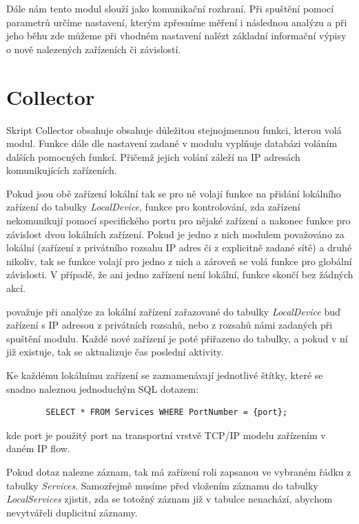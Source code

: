 \documentclass[thesis=B,czech,hidelinks]{FITthesis}[2019/03/21]
\begin{document}
    Dále nám tento modul slouží jako komunikační rozhraní. Při spuštění pomocí parametrů určíme nastavení, kterým zpřesníme měření i následnou analýzu a při jeho běhu zde můžeme při vhodném nastavení nalézt základní informační výpisy o nově nalezených zařízeních či závislostí.
    
    \section{Collector}
    Skript Collector obsahuje obsahuje důležitou stejnojmennou funkci, kterou volá  modul. Funkce dále dle nastavení zadané v modulu vyplňuje databázi  voláním dalších pomocných funkcí. Přičemž jejich volání záleží na IP adresách komunikujících zařízeních. 
    
    Pokud jsou obě zařízení lokální tak se pro ně volají funkce na přidání lokálního zařízení do tabulky \emph{LocalDevice}, funkce pro kontrolování, zda zařízení nekomunikují pomocí specifického portu pro nějaké zařízení a nakonec funkce pro závislost dvou lokálních zařízení. Pokud je jedno z nich modulem považováno za lokální (zařízení z privátního rozsahu IP adres či z explicitně zadané sítě) a druhé nikoliv, tak se funkce volají pro jedno z nich a zároveň se volá funkce pro globální závislosti. V případě, že ani jedno zařízení není lokální, funkce skončí bez žádných akcí.

     považuje při analýze za lokální zařízení zařazované do tabulky \emph{LocalDevice} buď zařízení s IP adresou z privátních rozsahů, nebo z rozsahů námi zadaných při spuštění modulu. Každé nové zařízení je poté přiřazeno do tabulky, a pokud v ní již existuje, tak se aktualizuje čas poslední aktivity.
    
    Ke každému lokálnímu zařízení se zaznamenávají jednotlivé štítky, které se snadno naleznou jednoduchým SQL dotazem:
    
    \begin{verbatim}
        SELECT * FROM Services WHERE PortNumber = {port};\end{verbatim}
     kde port je použitý port na transportní vrstvě TCP/IP modelu zařízením v daném IP flow.
    
    Pokud dotaz nalezne záznam, tak má zařízení roli zapsanou ve vybraném řádku z tabulky \emph{Services}. Samozřejmě musíme před vložením záznamu do tabulky \emph{LocalServices} zjistit, zda se totožný záznam již v tabulce nenachází, abychom nevytvářeli duplicitní záznamy.
    
\end{document}
